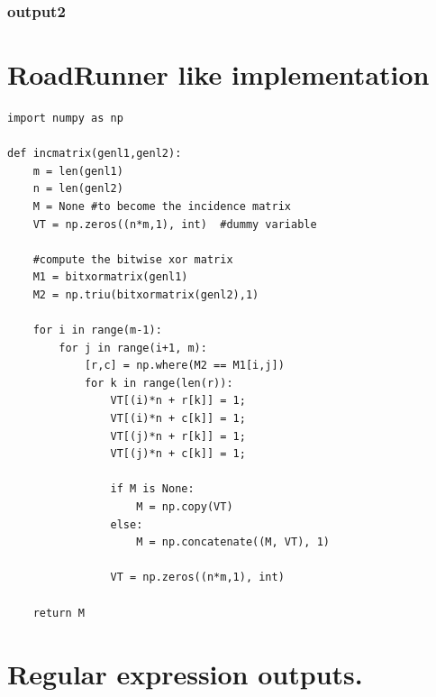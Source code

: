 \documentclass[runningheads]{llncs}
\begin{document}
\subsubsection{output2}
\section{RoadRunner like implementation}
\begin{lstlisting}
import numpy as np
 
def incmatrix(genl1,genl2):
    m = len(genl1)
    n = len(genl2)
    M = None #to become the incidence matrix
    VT = np.zeros((n*m,1), int)  #dummy variable
 
    #compute the bitwise xor matrix
    M1 = bitxormatrix(genl1)
    M2 = np.triu(bitxormatrix(genl2),1) 
 
    for i in range(m-1):
        for j in range(i+1, m):
            [r,c] = np.where(M2 == M1[i,j])
            for k in range(len(r)):
                VT[(i)*n + r[k]] = 1;
                VT[(i)*n + c[k]] = 1;
                VT[(j)*n + r[k]] = 1;
                VT[(j)*n + c[k]] = 1;
 
                if M is None:
                    M = np.copy(VT)
                else:
                    M = np.concatenate((M, VT), 1)
 
                VT = np.zeros((n*m,1), int)
 
    return M
\end{lstlisting}




 
\appendix
\appendixpage
\section{\label{regexResults}Regular expression outputs.}
\end{document}
